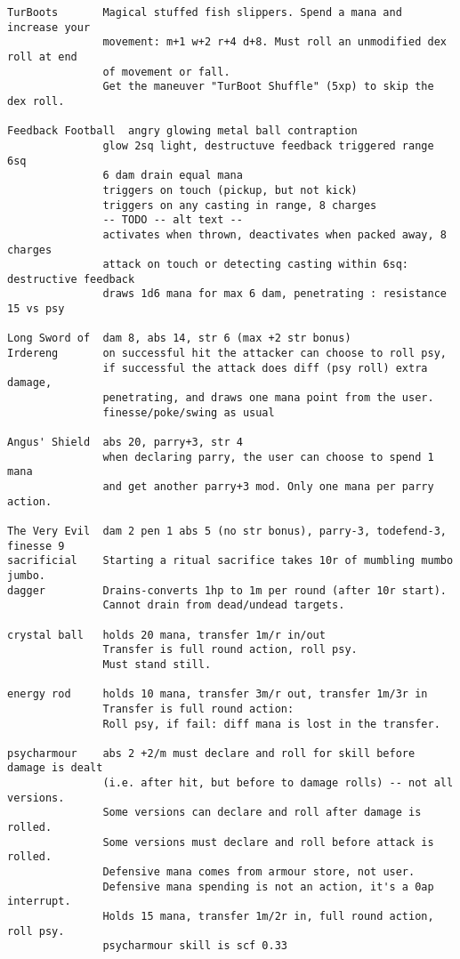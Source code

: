 \begin{verbatim}
TurBoots       Magical stuffed fish slippers. Spend a mana and increase your
               movement: m+1 w+2 r+4 d+8. Must roll an unmodified dex roll at end
               of movement or fall.
               Get the maneuver "TurBoot Shuffle" (5xp) to skip the dex roll.

Feedback Football  angry glowing metal ball contraption
               glow 2sq light, destructuve feedback triggered range 6sq
               6 dam drain equal mana
               triggers on touch (pickup, but not kick)
               triggers on any casting in range, 8 charges
               -- TODO -- alt text --
               activates when thrown, deactivates when packed away, 8 charges
               attack on touch or detecting casting within 6sq: destructive feedback
               draws 1d6 mana for max 6 dam, penetrating : resistance 15 vs psy

Long Sword of  dam 8, abs 14, str 6 (max +2 str bonus)
Irdereng       on successful hit the attacker can choose to roll psy,
               if successful the attack does diff (psy roll) extra damage,
               penetrating, and draws one mana point from the user.
               finesse/poke/swing as usual

Angus' Shield  abs 20, parry+3, str 4
               when declaring parry, the user can choose to spend 1 mana
               and get another parry+3 mod. Only one mana per parry action.

The Very Evil  dam 2 pen 1 abs 5 (no str bonus), parry-3, todefend-3, finesse 9
sacrificial    Starting a ritual sacrifice takes 10r of mumbling mumbo jumbo.
dagger         Drains-converts 1hp to 1m per round (after 10r start).
               Cannot drain from dead/undead targets.

crystal ball   holds 20 mana, transfer 1m/r in/out
               Transfer is full round action, roll psy.
               Must stand still.

energy rod     holds 10 mana, transfer 3m/r out, transfer 1m/3r in
               Transfer is full round action:
               Roll psy, if fail: diff mana is lost in the transfer.

psycharmour    abs 2 +2/m must declare and roll for skill before damage is dealt
               (i.e. after hit, but before to damage rolls) -- not all versions.
               Some versions can declare and roll after damage is rolled.
               Some versions must declare and roll before attack is rolled.
               Defensive mana comes from armour store, not user.
               Defensive mana spending is not an action, it's a 0ap interrupt.
               Holds 15 mana, transfer 1m/2r in, full round action, roll psy.
               psycharmour skill is scf 0.33


\end{verbatim}
